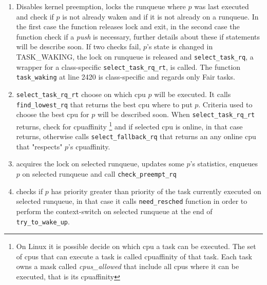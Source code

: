 \begin{enumerate}
\item Disables kernel preemption, locks the runqueue where $p$ was last executed and check 
if $p$ is not already waken and if it is not already on a runqueue. In the first case the 
function releases lock and exit, in the second case the function check if a
\textit{push} is necessary, further details about these if statements will be
describe soon. If two checks fail, $p$'s state is changed in TASK\_WAKING, the
lock on runqueue is released and \texttt{select\_task\_rq}, a wrapper for a 
class-specific \texttt{select\_task\_rq\_rt}, is called. The function 
\texttt{task\_waking} at line 2420 is class-specific and regards only Fair tasks.

\lstset{basicstyle=\footnotesize, language=c, captionpos=b, frame=single,label=lis:steps}


\item \texttt{select\_task\_rq\_rt} choose on which cpu $p$ will be executed. It
calls \texttt{find\_lowest\_rq} that returns the best cpu where to put $p$. Criteria
used to choose the best cpu for $p$ will be described soon. When \texttt{select\_task\_rq\_rt} 
returns, check for cpuaffinity \footnote{On Linux it is possible decide on which
cpu a task can be executed. The set of cpus that can execute a task is called 
cpuaffinity of that task. Each task owns a mask called \textit{cpus\_allowed} 
that include all cpus where it can be executed, that is its cpuaffinity} and 
if selected cpu is online, in that case returns, otherwise calls 
\texttt{select\_fallback\_rq} that returns an any online cpu that "respects" 
$p$'s cpuaffinity.

\lstset{basicstyle=\footnotesize, language=c, captionpos=b, frame=single,label=lis:steps}


\item acquires the lock on selected runqueue, updates some $p$'s statistics, enqueues 
$p$ on selected runqueue and call \texttt{check\_preempt\_rq} 

\lstset{basicstyle=\footnotesize, language=c, captionpos=b, frame=single,label=lis:steps}


\item checks if $p$ has priority greater than priority of the task currently
executed on selected runqueue, in that case it calls \texttt{need\_resched}
function in order to perform the context-switch on selected runqueue at the
end of \texttt{try\_to\_wake\_up}.


\end{enumerate}
